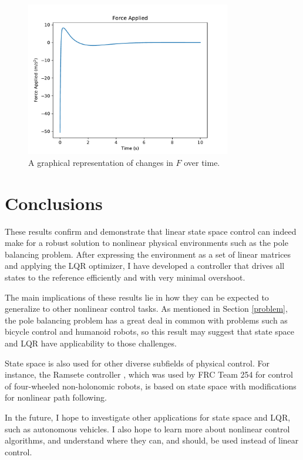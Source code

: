 \documentclass[11pt]{article}
\begin{document}
\begin{figure}[H]
    \centering
    \includegraphics[width=0.8\textwidth]{force}
    \caption{\label{force} A graphical representation of changes in $F$ over time.}
\end{figure}

\section{Conclusions}

These results confirm and demonstrate that linear state space control can indeed make for a robust solution to nonlinear physical environments such as the pole balancing problem. After expressing the environment as a set of linear matrices and applying the LQR optimizer, I have developed a controller that drives all states to the reference efficiently and with very minimal overshoot.

The main implications of these results lie in how they can be expected to generalize to other nonlinear control tasks. As mentioned in Section \ref{problem}, the pole balancing problem has a great deal in common with problems such as bicycle control and humanoid robots, so this result may suggest that state space and LQR have applicability to those challenges.

State space is also used for other diverse subfields of physical control. For instance, the Ramsete controller \cite{ramsete}, which was used by FRC Team 254 for control of four-wheeled non-holonomic robots, is based on state space with modifications for nonlinear path following.

In the future, I hope to investigate other applications for state space and LQR, such as autonomous vehicles. I also hope to learn more about nonlinear control algorithms, and understand where they can, and should, be used instead of linear control.

\printbibliography
\end{document}
